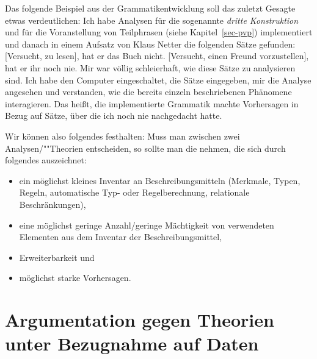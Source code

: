 Das folgende Beispiel aus der Grammatikentwicklung soll das zuletzt Gesagte etwas verdeutlichen:
Ich habe Analysen für die sogenannte \emph{dritte Konstruktion} und für die Voranstellung von Teilphrasen
(siehe Kapitel~\ref{sec-pvp}) implementiert und 
danach in einem Aufsatz von Klaus Netter \citeyearpar{Netter91} die folgenden Sätze gefunden:
\eal
\ex {}[Versucht, zu lesen], hat er das Buch nicht.
\ex {}[Versucht, einen Freund vorzustellen], hat er ihr noch nie.
\zl
Mir war völlig schleierhaft, wie diese Sätze zu analysieren sind. Ich habe den Computer eingeschaltet,
die Sätze eingegeben, mir die Analyse angesehen und verstanden, wie die bereits einzeln beschriebenen
Phänomene interagieren. Das heißt, die implementierte Grammatik machte Vorhersagen in Bezug auf
Sätze, über die ich noch nie nachgedacht hatte.

Wir können also folgendes festhalten:
Muss man zwischen zwei Analysen/""Theorien entscheiden, so sollte man die nehmen, die sich durch folgendes
auszeichnet:
\begin{itemize}
\item ein möglichst kleines Inventar an Beschreibungsmitteln (Merkmale, Typen, Regeln, 
      automatische Typ- oder Regelberechnung, relationale Beschränkungen),
\item eine möglichst geringe Anzahl/geringe Mächtigkeit von verwendeten Elementen 
      aus dem Inventar der Beschreibungsmittel,
\item Erweiterbarkeit und
\item möglichst starke Vorhersagen.
\end{itemize}


\section{Argumentation gegen Theorien unter Bezugnahme auf Daten}


